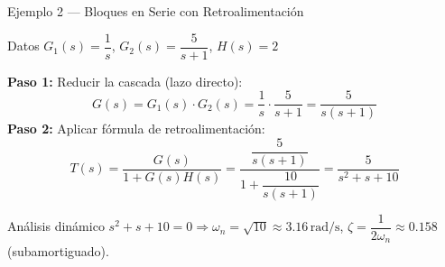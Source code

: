 \documentclass[aspectratio=169,xcolor=dvipsnames]{beamer}
\begin{document}
\begin{frame}{Ejemplo 2 --- Bloques en Serie con Retroalimentaci\'on}
    \begin{exampleblock}{Datos}
        $G_1(s) = \dfrac{1}{s}$, \quad $G_2(s) = \dfrac{5}{s+1}$, \quad $H(s) = 2$
    \end{exampleblock}
    \vspace{0.2em}
    \textbf{Paso 1:} Reducir la cascada (lazo directo):
    \begin{equation}
        G(s) = G_1(s)\cdot G_2(s) = \frac{1}{s} \cdot \frac{5}{s+1} = \frac{5}{s(s+1)}
    \end{equation}
    \textbf{Paso 2:} Aplicar f\'ormula de retroalimentaci\'on:
    \begin{equation}
        T(s) = \frac{G(s)}{1+G(s)H(s)} = \frac{\dfrac{5}{s(s+1)}}{1 + \dfrac{10}{s(s+1)}} = \frac{5}{s^2+s+10}
    \end{equation}
    \begin{alertblock}{An\'alisis din\'amico}
        $s^2+s+10 = 0 \Rightarrow \omega_n = \sqrt{10} \approx 3.16\,\text{rad/s}$, \quad $\zeta = \dfrac{1}{2\omega_n} \approx 0.158$ (subamortiguado).
    \end{alertblock}
\end{frame}
\end{document}

